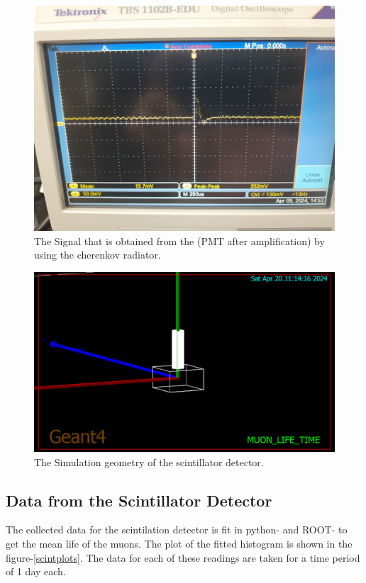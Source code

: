 \documentclass{article}
\begin{document}
\begin{multicols}{2}
\begin{figure}[H]
    \centering
    \includegraphics[width = \columnwidth]{Images/pulse_amp_cher.jpeg}
    \caption{The Signal that is obtained from the (PMT after amplification) by using the cherenkov radiator.}
    \label{pulse_dir_cher}
\end{figure}

\begin{figure}[H]
    \centering
    \includegraphics[width = \columnwidth]{Images/scint_sim_1.png}
    \caption{The Simulation geometry of the scintillator detector.\cite{agostinelli2003geant4}}
    \label{scintgeo}
\end{figure}

\subsection{Data from the Scintillator Detector}
The collected data for the scintilation detector is fit in python-\cite{python} and ROOT-\cite{ROOT} to get the mean life of the muons. The plot of the fitted histogram is shown in the figure-\ref{scintplots}. The data for each of these readings are taken for a time period of 1 day each.



\end{multicols}
\end{document}

